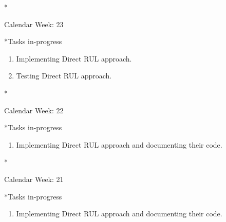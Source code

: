 \documentclass[11pt,a4paper]{article}
\begin{document}
\newpage
\begin{section}*{Calendar Week: 23  \hfill \date{11 June, 2021}}
 \begin{refsection}
     \begin{subsection}*{Tasks in-progress}
         \begin{enumerate}
             \item Implementing Direct RUL approach.
             \item Testing Direct RUL approach.
         \end{enumerate}
     \end{subsection}
 \end{refsection}
\end{section}
\newpage
\begin{section}*{Calendar Week: 22  \hfill \date{04 June, 2021}}
 \begin{refsection}
     \begin{subsection}*{Tasks in-progress}
         \begin{enumerate}
             \item Implementing Direct RUL approach and documenting their code.
         \end{enumerate}
     \end{subsection}
 \end{refsection}
\end{section}
\newpage
\begin{section}*{Calendar Week: 21  \hfill \date{28 May, 2021}}
 \begin{refsection}
     \begin{subsection}*{Tasks in-progress}
         \begin{enumerate}
             \item Implementing Direct RUL approach and documenting their code.
         \end{enumerate}
     \end{subsection}
 \end{refsection}
\end{section}
\newpage
\end{document}
